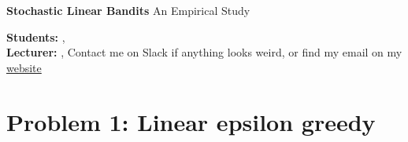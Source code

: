 





\begin{Large}
    \textsf{\textbf{Stochastic Linear Bandits}}
    An Empirical Study
\end{Large}

\vspace{1ex}

\textsf{\textbf{Students:}} , \\
\textsf{\textbf{Lecturer:}} , Contact me on Slack if anything looks weird, or find my email on my \href{www.cvernade.com}{website} 

\section{Problem 1: Linear epsilon greedy}

